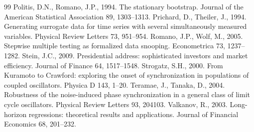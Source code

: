 \documentclass[preprint,12pt,authoryear]{elsarticle}
\begin{document}
\begin{thebibliography}{99}
Politis, D.N., Romano, J.P., 1994. The stationary bootstrap. Journal of the American Statistical Association 89, 1303--1313.
Prichard, D., Theiler, J., 1994. Generating surrogate data for time series with several simultaneously measured variables. Physical Review Letters 73, 951--954.
Romano, J.P., Wolf, M., 2005. Stepwise multiple testing as formalized data snooping. Econometrica 73, 1237--1282.
Stein, J.C., 2009. Presidential address: sophisticated investors and market efficiency. Journal of Finance 64, 1517--1548.
Strogatz, S.H., 2000. From Kuramoto to Crawford: exploring the onset of synchronization in populations of coupled oscillators. Physica D 143, 1--20.
Teramae, J., Tanaka, D., 2004. Robustness of the noise-induced phase synchronization in a general class of limit cycle oscillators. Physical Review Letters 93, 204103.
Valkanov, R., 2003. Long-horizon regressions: theoretical results and applications. Journal of Financial Economics 68, 201--232.
\end{thebibliography}
\end{document}
